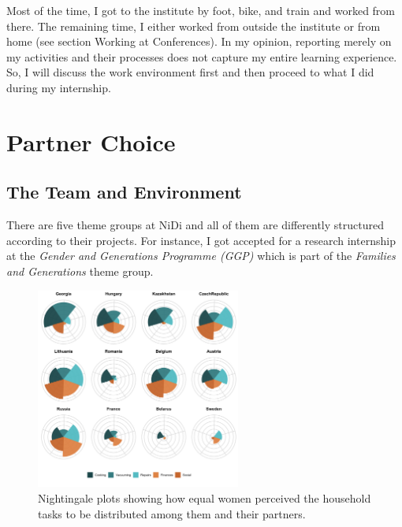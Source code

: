 \documentclass[man, 12pt, a4paper]{apa6}
\begin{document}
Most of the time, I got to the institute by foot, bike, and train and worked from there. The remaining time, I either worked from outside the institute or from home (see section Working at Conferences). In my opinion, reporting merely on my activities and their processes does not capture my entire learning experience. So, I will discuss the work environment first and then proceed to what I did during my internship.  

\section{Partner Choice} 
 
\subsection{The Team and Environment}

There are five theme groups at NiDi and all of them are differently structured according to their projects. For instance, I got accepted for a research internship at the \textit{Gender and Generations Programme (GGP)} which is part of the \textit{Families and Generations} theme group. 

\begin{figure}
  \vspace{-30pt}
  \begin{center}
    \includegraphics[width=0.6\textwidth]{Nightingale}
  \end{center}
  \vspace{-30pt}
  \caption{Nightingale plots showing how equal women perceived the household tasks to be distributed among them and their partners.}
\end{figure}

\printbibliography

\end{document}
